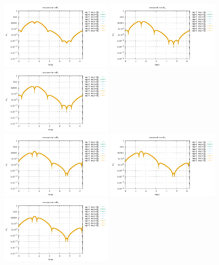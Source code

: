 \begin{center}
\includegraphics[width=5.7cm]{python_codes/fieldstone_152/results/exp2/sr1_R1}
\includegraphics[width=5.7cm]{python_codes/fieldstone_152/results/exp2/sr2_R1}
\includegraphics[width=5.7cm]{python_codes/fieldstone_152/results/exp2/sr3_R1}\\
\includegraphics[width=5.7cm]{python_codes/fieldstone_152/results/exp2/sr1_R2}
\includegraphics[width=5.7cm]{python_codes/fieldstone_152/results/exp2/sr2_R2}
\includegraphics[width=5.7cm]{python_codes/fieldstone_152/results/exp2/sr3_R2}\\
\end{center}


